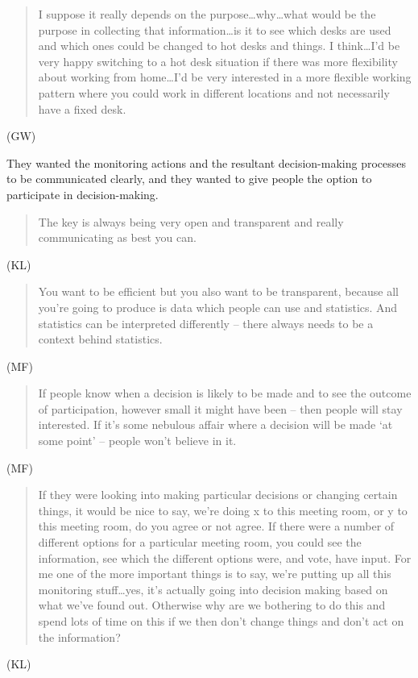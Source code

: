 \begin{quote}I suppose it really depends on the purpose\ldots why\ldots what would be the
purpose in collecting that information\ldots is it to see which desks are
used and which ones could be changed to hot desks and things. I
think\ldots I’d be very happy switching to a hot desk situation if there was
more flexibility about working from home\ldots I’d be very interested in a
more flexible working pattern where you could work in different
locations and not necessarily have a fixed desk.\end{quote} (GW)

They wanted the monitoring actions and the resultant decision-making
processes to be communicated clearly, and they wanted to give people
the option to participate in decision-making.

\begin{quote}The key is always being very open and transparent and really
communicating as best you can.\end{quote} (KL)

\begin{quote}You want to be efficient but you also want to be transparent, because
all you’re going to produce is data which people can use and
statistics. And statistics can be interpreted differently – there
always needs to be a context behind statistics.\end{quote} (MF) 

\begin{quote}If people know when a decision is likely to be made and to see the
outcome of participation, however small it might have been – then
people will stay interested. If it’s some nebulous affair where a
decision will be made ‘at some point’ – people won’t believe in it.\end{quote}
(MF)

\begin{quote}If they were looking into making particular decisions or changing
certain things, it would be nice to say, we’re doing x to this meeting
room, or y to this meeting room, do you agree or not agree. If there
were a number of different options for a particular meeting room, you
could see the information, see which the different options were, and
vote, have input. For me one of the more important things is to say,
we’re putting up all this monitoring stuff\ldots yes, it’s actually going
into decision making based on what we’ve found out. Otherwise why are
we bothering to do this and spend lots of time on this if we then
don’t change things and don’t act on the information?\end{quote} (KL)

